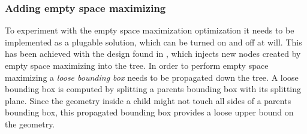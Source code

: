 \subsubsection{Adding empty space maximizing}\label{sec:gpuEmptySpace}


To experiment with the empty space maximization optimization it needs to be
implemented as a plugable solution, which can
be turned on and off at will. This has been achieved with the design found in
, which injects new nodes created by empty
space maximizing into the tree. In order to perform empty space maximizing a
\textit{loose bounding box} needs to be propagated down the tree. A loose
bounding box is computed by splitting a parents bounding box with its splitting
plane. Since the geometry inside a child might not touch all sides of a parents
bounding box, this propagated bounding box provides a loose upper bound on the
geometry.

